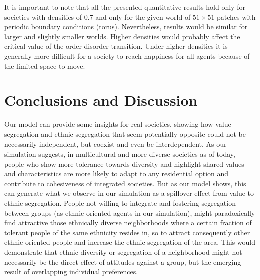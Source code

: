 \documentclass{ws-acs}
\begin{document}
{It is important to note that all the presented quantitative results hold only for societies with densities of 0.7 and only for the given world of $51\times 51$ patches with periodic boundary conditions (torus). Nevertheless, results would be similar for larger and slightly smaller worlds. Higher densities would probably affect the critical value of the order-disorder transition. Under higher densities it is generally more difficult for a society to reach happiness for all agents because of the limited space to move.


\section{Conclusions and Discussion}

Our model can provide some insights for real societies, showing how value segregation and ethnic segregation that seem potentially opposite could not be necessarily independent, but coexist and even be interdependent. As our simulation suggests, in multicultural and more diverse societies as of today, people who show more tolerance towards diversity and highlight shared values and characteristics are more likely to adapt to any residential option and contribute to cohesiveness of integrated societies. But as our model shows, this can  generate what we observe in our simulation as a spillover effect from value to ethnic segregation. People not willing to integrate and fostering segregation between groups (as ethnic-oriented agents in our simulation), might paradoxically find attractive those ethnically diverse neighborhoods where a certain fraction of tolerant people of the same ethnicity resides in, so to attract consequently other ethnic-oriented people and increase  the ethnic segregation of the area. This would demonstrate that ethnic diversity or segregation of a neighborhood might not necessarily be the direct effect of attitudes against a group, but the emerging result of overlapping individual preferences.

}
\end{document}

